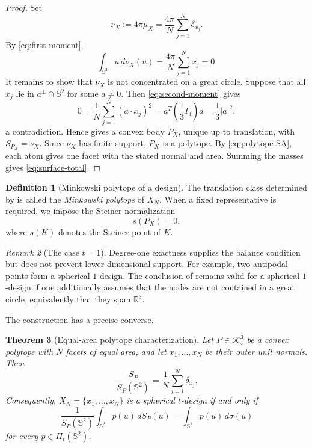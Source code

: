\documentclass[11pt]{article}
\newtheorem{theorem}{Theorem}[section]
\theoremstyle{definition}
\newtheorem{definition}[theorem]{Definition}
\theoremstyle{remark}
\newtheorem{remark}[theorem]{Remark}
\newcommand{\Sph}{\mathbb S}
\newcommand{\R}{\mathbb R}
\newcommand{\K}{\mathcal K}
\begin{document}
\begin{proof}
Set
\[
\nu_X:=4\pi\mu_X=\frac{4\pi}{N}\sum_{j=1}^N\delta_{x_j}.
\]
By \eqref{eq:first-moment},
\[
\int_{\Sph^2}u\,d\nu_X(u)=\frac{4\pi}{N}\sum_{j=1}^Nx_j=0.
\]
It remains to show that $\nu_X$ is not concentrated on a great circle. Suppose that all $x_j$ lie in $a^\perp\cap\Sph^2$ for some $a\ne0$. Then \eqref{eq:second-moment} gives
\[
0=\frac1N\sum_{j=1}^N(a\cdot x_j)^2
=a^T\left(\frac13I_3\right)a
=\frac13|a|^2,
\]
a contradiction. Hence  gives a convex body $P_X$, unique up to translation, with $S_{P_X}=\nu_X$. Since $\nu_X$ has finite support, $P_X$ is a polytope. By \eqref{eq:polytope-SA}, each atom gives one facet with the stated normal and area. Summing the masses gives \eqref{eq:surface-total}.
\end{proof}

\begin{definition}[Minkowski polytope of a design]\label{def:minkowski-polytope}
The translation class determined by  is called the \emph{Minkowski polytope} of $X_N$. When a fixed representative is required, we impose the Steiner normalization
\begin{equation}\label{eq:steiner-normalization}
s(P_X)=0,
\end{equation}
where $s(K)$ denotes the Steiner point of $K$.
\end{definition}

\begin{remark}[The case $t=1$]
Degree-one exactness supplies the balance condition but does not prevent lower-dimensional support. For example, two antipodal points form a spherical $1$-design. The conclusion of  remains valid for a spherical $1$-design if one additionally assumes that the nodes are not contained in a great circle, equivalently that they span $\R^3$.
\end{remark}

The construction has a precise converse.

\begin{theorem}[Equal-area polytope characterization]\label{thm:converse}
Let $P\in\K^3_\circ$ be a convex polytope with $N$ facets of equal area, and let $x_1,\dots,x_N$ be their outer unit normals. Then
\begin{equation}\label{eq:normalized-SP}
\frac{S_P}{S_P(\Sph^2)}=\frac1N\sum_{j=1}^N\delta_{x_j}.
\end{equation}
Consequently, $X_N=\{x_1,\dots,x_N\}$ is a spherical $t$-design if and only if
\begin{equation}\label{eq:polytope-char}
\frac1{S_P(\Sph^2)}\int_{\Sph^2}p(u)\,dS_P(u)
=\int_{\Sph^2}p(u)\,d\sigma(u)
\end{equation}
for every $p\in\Pi_t(\Sph^2)$.
\end{theorem}
\end{document}
